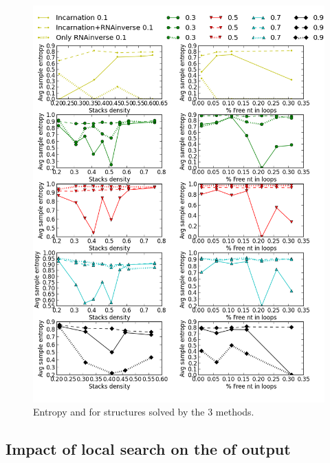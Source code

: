 \begin{figure}[ht!]
	\centering
	\includegraphics[scale=0.4]{Figures/RNAinverse_data_100.png}
	\caption{Entropy and \GCContent  for structures solved by
	the 3 methods.}
	\label{fig:rnainverse}
\end{figure}



%
\subsection{Impact of local search on the \GCContent of \ourprog output}

